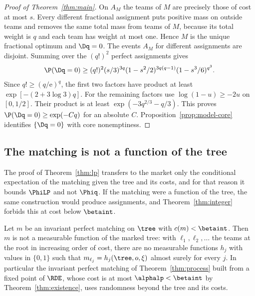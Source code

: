 \begin{proof}[Proof of Theorem~\ref{thm:main}]
On $A_M$ the teams of $M$ are precisely those of cost at most $s$. Every
different fractional assignment puts positive mass on outside teams and
removes the same total mass from teams of $M$, because its total weight is $q$
and each team has weight at most one. Hence $M$ is the unique fractional optimum
and $\Dq=0$. The events $A_M$ for different assignments are disjoint. Summing over the
$(q!)^2$ perfect assignments gives
\begin{equation}\label{eq:proofmain-planted}
\P(\Dq=0)\ge (q!)^2(s/3)^{3q}
  (1-s^2/2)^{3q(q-1)}(1-s^3/6)^{q^3}.
\end{equation}
Since $q!\ge(q/\mathrm e)^q$, the first two factors have product at least
$\exp[-(2+3\log 3)q]$. For the remaining factors use $\log(1-u)\ge-2u$
on $[0,1/2]$. Their product is at least $\exp(-3q^{2/3}-q/3)$.
This proves $\P(\Dq=0)\ge \exp(-Cq)$ for an absolute $C$.
Proposition~\ref{prop:model-core} identifies $\{\Dq=0\}$ with core nonemptiness.
\end{proof}

\subsection{The matching is not a function of the tree}\label{sec:proofmain-endogeny}

The proof of Theorem~\ref{thm:lp} transfers to the market only the conditional expectation
of the matching given the tree and its costs, and for that reason it bounds $\PhiLP$ and
not $\Phiq$. If the matching were a function of the tree, the same construction would
produce assignments, and Theorem~\ref{thm:integer} forbids this at cost below $\betaint$.

\begin{corollary}\label{cor:proofmain-endogeny}
Let $m$ be an invariant perfect matching on $\tree$ with $c(m)<\betaint$. Then $m$ is not a
measurable function of the marked tree: with $\ell_1,\ell_2,\dots$ the teams at the root in
increasing order of cost, there are no measurable functions $h_j$ with values in $\{0,1\}$
such that $m_{\ell_j}=h_j(\tree,o,\xi)$ almost surely for every $j$. In particular the
invariant perfect matching of Theorem~\ref{thm:process} built from a fixed point of $\RDE$,
whose cost is at most $\alphalp<\betaint$ by Theorem~\ref{thm:existence}, uses randomness
beyond the tree and its costs.
\end{corollary}

